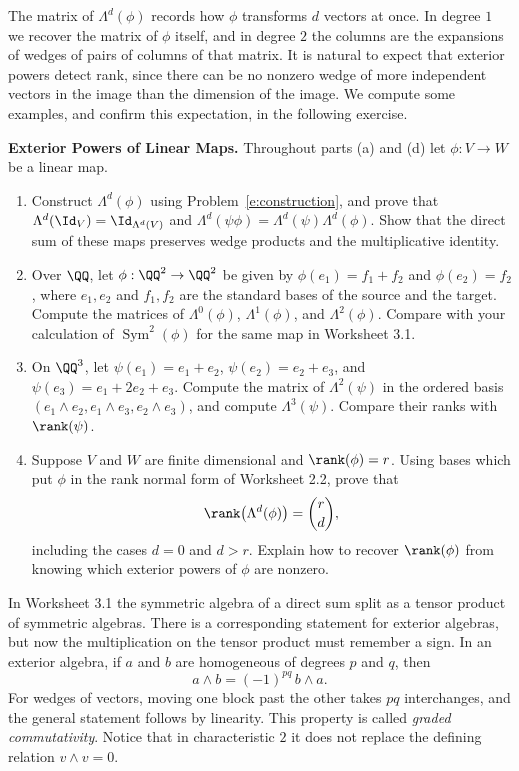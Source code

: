 \documentclass[12pt,reqno]{amsart}
\DeclareMathOperator{\Sym}{Sym}
\begin{document}
The matrix of $\Lambda^d(\phi)$ records how $\phi$ transforms $d$ vectors at once. In degree $1$ we recover the matrix of $\phi$ itself, and in degree $2$ the columns are the expansions of wedges of pairs of columns of that matrix. It is natural to expect that exterior powers detect rank, since there can be no nonzero wedge of more independent vectors in the image than the dimension of the image. We compute some examples, and confirm this expectation, in the following exercise.

\hrulefill

\begin{problems}
\item\label{e:maps} \textbf{Exterior Powers of Linear Maps.} Throughout parts (a) and (d) let $\phi:V\to W$ be a linear map.
\begin{enumerate}
\item Construct $\Lambda^d(\phi)$ using Problem~\ref{e:construction}, and prove that $\Lambda^d(\Id_V)=\Id_{\Lambda^d(V)}$ and $\Lambda^d(\psi\phi)=\Lambda^d(\psi)\Lambda^d(\phi)$. Show that the direct sum of these maps preserves wedge products and the multiplicative identity.
\item Over $\QQ$, let $\phi:\QQ^2\to\QQ^2$ be given by $\phi(e_1)=f_1+f_2$ and $\phi(e_2)=f_2$, where $e_1,e_2$ and $f_1,f_2$ are the standard bases of the source and the target. Compute the matrices of $\Lambda^0(\phi)$, $\Lambda^1(\phi)$, and $\Lambda^2(\phi)$. Compare with your calculation of $\Sym^2(\phi)$ for the same map in Worksheet 3.1.
\item On $\QQ^3$, let $\psi(e_1)=e_1+e_2$, $\psi(e_2)=e_2+e_3$, and $\psi(e_3)=e_1+2e_2+e_3$. Compute the matrix of $\Lambda^2(\psi)$ in the ordered basis $(e_1\wedge e_2,e_1\wedge e_3,e_2\wedge e_3)$, and compute $\Lambda^3(\psi)$. Compare their ranks with $\rank(\psi)$.
\item Suppose $V$ and $W$ are finite dimensional and $\rank(\phi)=r$. Using bases which put $\phi$ in the rank normal form of Worksheet 2.2, prove that
\[
\rank\big(\Lambda^d(\phi)\big)=\binom{r}{d},
\]
including the cases $d=0$ and $d>r$. Explain how to recover $\rank(\phi)$ from knowing which exterior powers of $\phi$ are nonzero.
\end{enumerate}
\end{problems}

\hrulefill

In Worksheet 3.1 the symmetric algebra of a direct sum split as a tensor product of symmetric algebras. There is a corresponding statement for exterior algebras, but now the multiplication on the tensor product must remember a sign. In an exterior algebra, if $a$ and $b$ are homogeneous of degrees $p$ and $q$, then
\[
a\wedge b=(-1)^{pq}\,b\wedge a.
\]
For wedges of vectors, moving one block past the other takes $pq$ interchanges, and the general statement follows by linearity. This property is called \emph{graded commutativity}. Notice that in characteristic $2$ it does not replace the defining relation $v\wedge v=0$.
\end{document}
